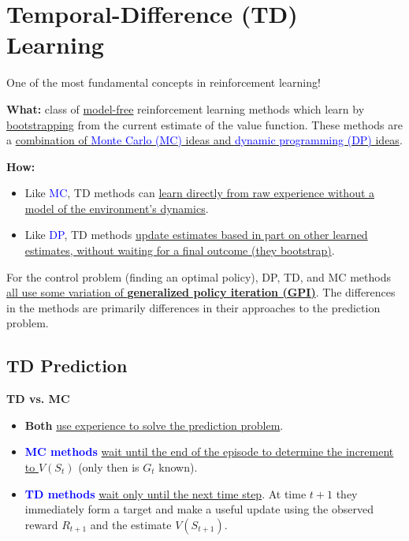 \documentclass[12pt, a4paper]{article}
\let\stdsection\section
\renewcommand\section{\newpage\stdsection} %
\begin{document}



\section{Temporal-Difference (TD) Learning}\label{temporal-difference-learning}


\begin{tcolorbox}[colback=green!5,colframe=green!75!black]
  One of the most fundamental concepts in reinforcement learning!
\end{tcolorbox}


\textbf{What:} class of \uline{model-free} reinforcement learning methods which learn by \uline{bootstrapping} from the current estimate of the value function. These methods are a \uline{combination of \textcolor{blue}{Monte Carlo (MC)} ideas and \textcolor{blue}{dynamic programming (DP)} ideas}.

\textbf{How:}
\begin{itemize}
  \item Like \textcolor{blue}{MC}, TD methods can \uline{learn directly from raw experience without a model of the environment’s dynamics}.
  \item Like \textcolor{blue}{DP}, TD methods \uline{update estimates based in part on other learned estimates, without waiting for a final outcome (they bootstrap)}.
\end{itemize}

For the control problem (finding an optimal policy), DP, TD, and MC methods \uline{all use some variation of \textbf{generalized policy iteration (GPI)}}. The differences in the methods are primarily differences in their approaches to the prediction problem.










\subsection{TD Prediction}\label{td-prediction}

\textbf{TD vs. MC}
\begin{itemize}
  \item \textbf{Both} \uline{use experience to solve the prediction problem}.
  \item \textbf{\textcolor{blue}{MC methods}} \uline{wait until the end of the episode to determine the increment to $V(S_t)$} (only then is $G_t$ known).
  \item \textbf{\textcolor{blue}{TD methods}} \uline{wait only until the next time step}. At time $t + 1$ they immediately form a target and make a useful update using the observed reward $R_{t+1}$ and the estimate $V (S_{t+1})$.
\end{itemize}
\end{document}
